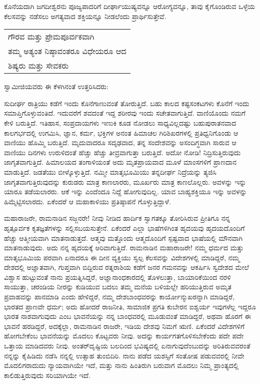 ಕೊನೆಯದಾಗಿ ಜಗದೀಶ್ವರನು ಪೂಜ್ಯಪಾದರಿಗೆ ದೀರ್ಘಾಯುಷ್ಯವನ್ನೂ ಆರೋಗ್ಯವನ್ನೂ, ತಾವು ಕೈಗೊಂಡಿರುವ ಒಳ್ಳೆಯ ಕೆಲಸವನ್ನು ನಡೆಸಲು ಅಗತ್ಯವಾದ ಶಕ್ತಿಯನ್ನೂ ನೀಡಲೆಂದು ಪ್ರಾರ್ಥಿಸುತ್ತೇವೆ.

\begin{longtable}[r]{@{}l@{}}
ಗೌರವ ಮತ್ತು ಪ್ರೇಮಪೂರ್ವಕವಾಗಿ \\
ತಮ್ಮ ಅತ್ಯಂತ ನಿಷ್ಠಾವಂತರೂ ವಿಧೇಯರೂ ಆದ \\
ಶಿಷ್ಯರು ಮತ್ತು ಸೇವಕರು \\
\end{longtable}

ಸ್ವಾಮೀಜಿಯವರು ಈ ಕೆಳಗಿನಂತೆ ಉತ್ತರಿಸಿದರು:

ಸುದೀರ್ಘ ರಾತ್ರಿಯು ಕಡೆಗೆ ಇಂದು ಕೊನೆಗಾಣುವಂತೆ ತೋರುತ್ತಿದೆ. ಬಹು ಕಾಲದ ಕಷ್ಟಸಂಕಟಗಳು ಕೊನೆಗೆ ಇಂದು ಸಮಾಪ್ತಿಗೊಳ್ಳುವಂತಿದೆ. ಇದುವರೆಗೆ ಶವದಂತೆ ಇದ್ದ ಶರೀರವು ಇಂದು ಸಚೇತವಾಗುತ್ತಿದೆ. ವಾಣಿಯೊಂದು ನಮಗೆ ಕೇಳಿ ಬರುತ್ತಿದೆ. ಇತಿಹಾಸ, ಸಂಪ್ರದಾಯಗಳು ಇಣುಕಿ ಕೂಡ ನೋಡಲು ಸಾಧ್ಯವಿಲ್ಲದಷ್ಟು ಬಹುಪುರಾತನವಾದ ಕಾಲಗರ್ಭದಲ್ಲಿ ಉಗಮಿಸಿ, ಜ್ಞಾನ, ಕರ್ಮ, ಭಕ್ತಿಗಳ ಅನಂತ ಹಿಮಾಚಲ ಗಿರಿಶಿಖರಗಳಲ್ಲಿ ಪ್ರತಿಧ್ವನಿಗೊಂಡು ಆ ವಾಣಿಯು ಹೊಮ್ಮಿ ಬರುತ್ತಿದೆ. ಮೃದುವಾದರೂ ಸದೃಢವಾದ, ತನ್ನ ಸಂದೇಶವನ್ನು ಅಸಂದಿಗ್ಧವಾಗಿ ಸಾರುವ ಆ ವಾಣಿಯು ದಿನಗಳು ಉರುಳಿದಂತೆ ಹೆಚ್ಚು ಹೆಚ್ಚು ತೀವ್ರವಾಗುತ್ತಾ ಬರುತ್ತಿದೆ. ಅದೋ ನೋಡಿ! ನಿದ್ರಿಸುತ್ತಿರುವುದು ಜಾಗೃತವಾಗುತ್ತಿದೆ. ಹಿಮಾಲಯದ ತಂಗಾಳಿಯಂತೆ ಅದು ಮೃತಪ್ರಾಯವಾದ ಮೂಳೆ ಮಾಂಸಗಳಿಗೆ ಪ್ರಾಣದಾನ ಮಾಡುತ್ತಿದೆ. ಜಡತೆಯು ಬೀಳ್ಕೊಳ್ಳುತ್ತಿದೆ. ನಮ್ಮೀ ಮಾತೃಭೂಮಿಯು ತನ್ನದೀರ್ಘ ನಿದ್ರೆಯನ್ನು ತ್ಯಜಿಸಿ ಜಾಗೃತವಾಗುತ್ತಿರುವುದನ್ನು ಕುರುಡರು ಮಾತ್ರ ಕಾಣ\-ಲಾರರು, ಮೂರ್ಖರು ಮಾತ್ರ ಕಾಣಲೊಲ್ಲರು. ಅವಳನ್ನು ಇನ್ನು ಯಾರೂ ತಡೆಯ\-ಲಾರರು. ಆಕೆ ಇನ್ನು ಎಂದೆಂದೂ ನಿದ್ದೆ ಹೋಗುವುದಿಲ್ಲ. ಯಾವ ಬಾಹ್ಯಶಕ್ತಿಯೂ ಇನ್ನು ಅವಳನ್ನು ಹಿಮ್ಮೆಟ್ಟಿಸಲಾರದು. ಏಕೆಂದರೆ ಆ ಮಹಾಕಾಳಿಯು ಪ್ರತಿಷ್ಠಾಪನೆ ಗೊಳ್ಳುತ್ತಿದ್ದಾಳೆ.

ಮಹಾರಾಜರೇ, ರಾಮನಾಡಿನ ಸಜ್ಜನರೇ! ನೀವು ನೀಡಿದ ಹಾರ್ದಿಕ ಸ್ವಾಗತಕ್ಕೂ ತೋರಿಸಿರುವ ಪ್ರೀತಿಗೂ ನನ್ನ ಹೃತ್ಪೂರ್ವಕ ಕೃತಜ್ಞತೆಗಳನ್ನು ಸಲ್ಲಿಸಬಯಸುತ್ತೇನೆ. ಏಕೆಂದರೆ ಎಲ್ಲಾ ಭಾಷೆಗಳಿಗಿಂತ ಹೃದಯವು ಹೃದಯದೊಂದಿಗೆ ಹೆಚ್ಚು ಆತ್ಮೀಯವಾಗಿ ಮಾತನಾಡುತ್ತದೆ. ಆತ್ಮವು ಮತ್ತೊಂದು ಆತ್ಮದೊಂದಿಗೆ ಸ್ಪಷ್ಟವಾದ ಭಾಷೆಯಲ್ಲಿ ಮೌನವಾಗಿ ಮಾತನಾಡುವುದು. ಅದು ನನ್ನ ಹೃದಯಕ್ಕೆ ಅರಿವಾಗುತ್ತಿದೆ. ರಾಮನಾಡಿನ ಮಹಾರಾಜರೇ! ನಮ್ಮ ಧರ್ಮದ ಮತ್ತು ಮಾತೃಭೂಮಿಯ ಪರವಾಗಿ ಏನಾದರೂ ಈ ದೀನ ವ್ಯಕ್ತಿಯು ಸ್ವಲ್ಪ ಕೆಲಸವನ್ನು ವಿದೇಶಗಳಲ್ಲಿ ಮಾಡಿದ್ದರೆ, ನಮ್ಮ ದೇಶದಲ್ಲಿ ಅಜ್ಞಾತವಾಗಿ, ಗುಪ್ತವಾಗಿ ಬಿದ್ದಿರುವ ರತ್ನರಾಶಿಯ ಕಡೆಗೆ ಜನರ ಗಮನವನ್ನು ಆಕರ್ಷಿಸಿ ಸ್ವದೇಶದ ಮೇಲೆ ವಿಶ್ವಾಸ ಹುಟ್ಟುವಂತೆ ನಾನು ಪ್ರಯತ್ನಿಸಿದ್ದರೆ, ಅಜ್ಞಾನಾಂಧಕಾರದಲ್ಲಿ ತೊಳಲುತ್ತಾ, ಬಾಯಾರಿಕೆಯಿಂದ ನರಳಿ ಸಾಯುತ್ತಾ, ಚರಂಡಿಯ ನೀರನ್ನು ಕುಡಿಯುವ ಬದಲು ತಮ್ಮ ಮನೆಯ ಬಳಿಯಲ್ಲೇ ಹರಿಯುತ್ತಿರುವ ಅಮೃತ ಪ್ರವಾಹವನ್ನು ಪಾನಮಾಡಿ ಎಂದು ಹೇಳಿದ್ದರೆ, ನಮ್ಮ ದೇಶಬಾಂಧವರನ್ನು ಕಾರ್ಯೋನ್ಮುಖರನ್ನಾಗಿ ಮಾಡಿದ್ದರೆ, ಭಾರತದ ಪ್ರಾಣವೇ ಧರ್ಮ; ಅದು ಹೋದರೆ ರಾಜನೀತಿ, ಸಾಮಾಜಿಕ ಪ್ರಗತಿ ಕುಬೇರನ ಐಶ್ವರ್ಯ ಇವುಗಳೆಲ್ಲ ಇದ್ದರೂ ಭಾರತ ನಾಶವಾಗುವುದು ಎಂಬ ಭಾವನೆಯನ್ನು ನನ್ನ ಬಾಂಧವರಲ್ಲಿ ಮೂಡುವಂತೆ ಮಾಡಿದ್ದರೆ, ಅಥವಾ ಹೊರಗೆ ಈ ಭಾವನೆ ಹರಡಿದ್ದರೆ, ಅದಕ್ಕೆಲ್ಲಾ, ರಾಮನಾಡಿನ ರಾಜರೇ, ಇಡಿಯ ದೇಶವು ನಿಮಗೆ ಋಣಿ. ಏಕೆಂದರೆ ವಿದೇಶಗಳಿಗೆ ಹೋಗಬೇಕೆಂಬ ಭಾವನೆಯನ್ನು ಮೊದಲು ಕೊಟ್ಟವರು ನೀವು. ಅದನ್ನು ಕಾರ್ಯಗತಗೊಳಿಸಬೇಕೆಂದು ಪದೇ ಪದೇ ಒತ್ತಾಯ ಮಾಡಿದವರು ನೀವು. ಅಂತರ್​ದೃಷ್ಟಿಯ ಬಲದಿಂದ ಭವಿಷ್ಯದಲ್ಲಿ ಏನಾಗುವುದೆಂಬುದನ್ನು ಅರಿತಿರುವವರಂತೆ ನನ್ನನ್ನು ಕೈಹಿಡಿದು ನಡೆಸಿ ನನ್ನಲ್ಲಿ ಉತ್ಸಾಹ ತುಂಬಿದಿರಿ. ನಾನು ಪಡೆದ ಯಶಸ್ಸಿಗೆ ಸಂತೋಷ ಪಡುವವರಲ್ಲಿ ನೀವೇ ಮೊದಲಿಗ\-ರಾದುದು ನ್ಯಾಯವಾಗಿಯೇ ಇದೆ, ಮತ್ತು ನಾನು ಹಿಂತಿರುಗಿ ಬರುವಾಗ ಮೊದಲು ನಿಮ್ಮ ಪ್ರಾಂತ್ಯದಲ್ಲಿ ಕಾಲಿಡುತ್ತಿರುವುದು ಸರಿಯಾಗಿಯೇ ಇದೆ.

